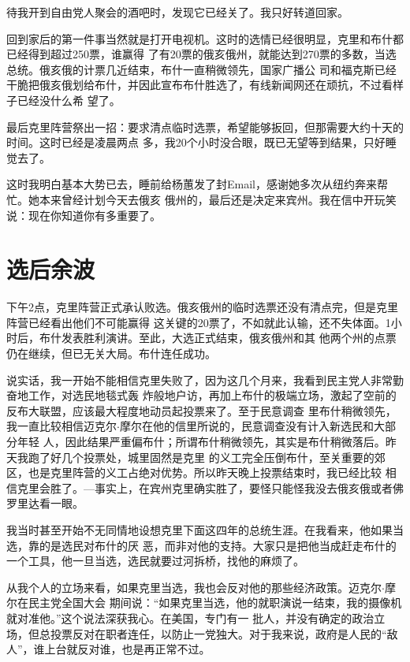 ﻿\documentclass[11pt]{article}
\begin{document}
待我开到自由党人聚会的酒吧时，发现它已经关了。我只好转道回家。

回到家后的第一件事当然就是打开电视机。这时的选情已经很明显，克里和布什都已经得到超过250票，谁赢得
了有20票的俄亥俄州，就能达到270票的多数，当选总统。俄亥俄的计票几近结束，布什一直稍微领先，国家广播公
司和福克斯已经干脆把俄亥俄划给布什，并因此宣布布什胜选了，有线新闻网还在顽抗，不过看样子已经没什么希
望了。

最后克里阵营祭出一招：要求清点临时选票，希望能够扳回，但那需要大约十天的时间。这时已经是凌晨两点
多，我20个小时没合眼，既已无望等到结果，只好睡觉去了。

这时我明白基本大势已去，睡前给杨蕙发了封Email，感谢她多次从纽约奔来帮忙。她本来曾经计划今天去俄亥
俄州的，最后还是决定来宾州。我在信中开玩笑说：现在你知道你有多重要了。

\section{选后余波}

下午2点，克里阵营正式承认败选。俄亥俄州的临时选票还没有清点完，但是克里阵营已经看出他们不可能赢得
这关键的20票了，不如就此认输，还不失体面。1小时后，布什发表胜利演讲。至此，大选正式结束，俄亥俄州和其
他两个州的点票仍在继续，但已无关大局。布什连任成功。

说实话，我一开始不能相信克里失败了，因为这几个月来，我看到民主党人非常勤奋地工作，对选民地毯式轰
炸般地户访，再加上布什的极端立场，激起了空前的反布大联盟，应该最大程度地动员起投票来了。至于民意调查
里布什稍微领先，我一直比较相信迈克尔$\cdot$摩尔在他的信里所说的，民意调查没有计入新选民和大部分年轻
人，因此结果严重偏布什；所谓布什稍微领先，其实是布什稍微落后。昨天我跑了好几个投票处，城里固然是克里
的义工完全压倒布什，至关重要的郊区，也是克里阵营的义工占绝对优势。所以昨天晚上投票结束时，我已经比较
相信克里会胜了。---事实上，在宾州克里确实胜了，要怪只能怪我没去俄亥俄或者佛罗里达看一眼。

我当时甚至开始不无同情地设想克里下面这四年的总统生涯。在我看来，他如果当选，靠的是选民对布什的厌
恶，而非对他的支持。大家只是把他当成赶走布什的一个工具，他一旦当选，选民就要过河拆桥，找他的麻烦了。

从我个人的立场来看，如果克里当选，我也会反对他的那些经济政策。迈克尔$\cdot$摩尔在民主党全国大会
期间说：``如果克里当选，他的就职演说一结束，我的摄像机就对准他。''这个说法深获我心。在美国，专门有一
批人，并没有确定的政治立场，但总投票反对在职者连任，以防止一党独大。对于我来说，政府是人民的``敌
人''，谁上台就反对谁，也是再正常不过。
\end{document}
